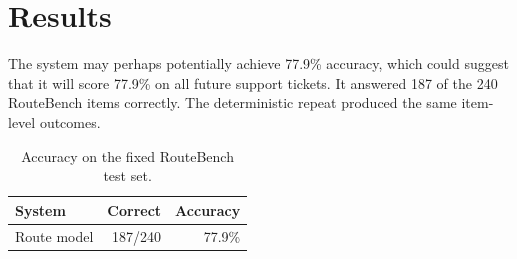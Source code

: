 \section{Results}

The system may perhaps potentially achieve 77.9\% accuracy, which could suggest
that it will score 77.9\% on all future support tickets. It answered 187 of the
240 RouteBench items correctly. The deterministic repeat produced the same
item-level outcomes.

\begin{table}[h]
\centering
\begin{tabular}{lrr}
\toprule
System & Correct & Accuracy \\
\midrule
Route model & 187/240 & 77.9\% \\
\bottomrule
\end{tabular}
\caption{Accuracy on the fixed RouteBench test set.}
\end{table}

